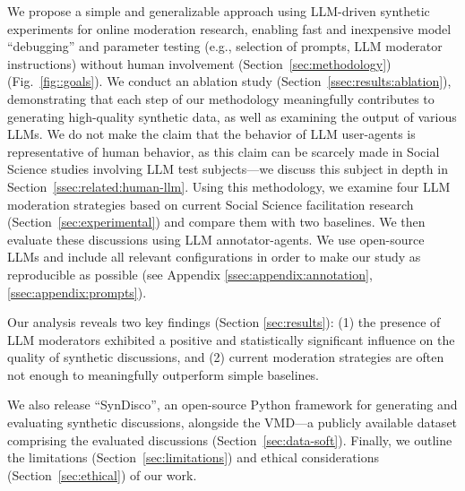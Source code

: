 We propose a simple and generalizable approach using \ac{LLM}-driven synthetic experiments for online moderation research, enabling fast and inexpensive model “debugging” and parameter testing (e.g., selection of prompts, \ac{LLM} moderator instructions) without human involvement (Section~\ref{sec:methodology}) (Fig.~\ref{fig::goals}). We conduct an ablation study (Section~\ref{ssec:results:ablation}), demonstrating that each step of our methodology meaningfully contributes to generating high-quality synthetic data, as well as examining the output of various \acp{LLM}. We do not make the claim that the behavior of \ac{LLM} user-agents is representative of human behavior, as this claim can be scarcely made in Social Science studies involving \ac{LLM} test subjects—we discuss this subject in depth in Section~\ref{ssec:related:human-llm}. Using this methodology, we examine four \ac{LLM} moderation strategies based on current Social Science facilitation research (Section~\ref{sec:experimental})
and compare them with two baselines. We then evaluate these discussions using \ac{LLM} annotator-agents. We use open-source \acp{LLM} and include all relevant configurations in order to make our study as reproducible as possible (see Appendix \ref{ssec:appendix:annotation}, \ref{ssec:appendix:prompts}).


 Our analysis reveals two key findings (Section \ref{sec:results}): (1) the presence of \ac{LLM} moderators exhibited a positive and statistically significant influence on the quality of synthetic discussions, and (2) current moderation strategies are often not enough to meaningfully outperform simple baselines. %

We also release “SynDisco”, an open-source Python framework for generating and evaluating synthetic discussions, alongside the \acf{VMD}\datasetlink—a publicly available dataset comprising the evaluated discussions (Section~\ref{sec:data-soft}). Finally, we outline the limitations (Section~\ref{sec:limitations}) and ethical considerations (Section~\ref{sec:ethical}) of our work.